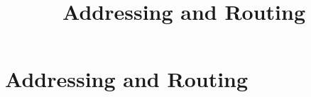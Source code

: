 \documentclass[../../OAE-SPEC-MAIN.tex]{subfiles}
\title{Addressing and Routing}
\begin{document}
\chapter{Addressing and Routing}
















\end{document}
